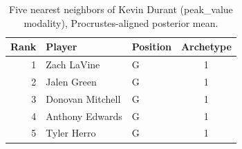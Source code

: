 \begin{table}[htbp]
  \centering\small
  \begin{tabular}{rllc}
    \toprule
    Rank & Player & Position & Archetype \\
    \midrule
    1 & Zach LaVine & G & 1 \\
    2 & Jalen Green & G & 1 \\
    3 & Donovan Mitchell & G & 1 \\
    4 & Anthony Edwards & G & 1 \\
    5 & Tyler Herro & G & 1 \\
    \bottomrule
  \end{tabular}
  \caption{Five nearest neighbors of Kevin Durant (peak_value modality), Procrustes-aligned posterior mean.}
  \label{tab:Kevin_Durant_neighbors_peak_value}
\end{table}

